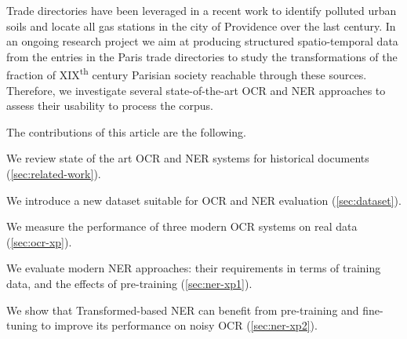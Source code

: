 Trade directories have been leveraged in a recent work to identify polluted urban soils \cite{bell2020automated} and locate all gas stations in the city of Providence over the last century.
In an ongoing research project we aim at producing structured spatio-temporal data from the entries in the Paris trade directories to study the transformations of the fraction of XIX\textsuperscript{th} century Parisian society reachable through these sources.
Therefore, we investigate several state-of-the-art OCR and NER approaches to assess their usability to process the corpus.

The contributions of this article are the following.
\begin{enumerate*}[(i)]
    \item We review state of the art OCR and NER systems for historical documents (\cref{sec:related-work}).
    \item We introduce a new dataset suitable for OCR and NER evaluation (\cref{sec:dataset}).
    \item We measure the performance of three modern OCR systems on real data (\cref{sec:ocr-xp}).
    \item We evaluate modern NER approaches: their requirements in terms of training data, and the effects of pre-training (\cref{sec:ner-xp1}).
    \item We show that Transformed-based NER can benefit from pre-training and fine-tuning to improve its performance on noisy OCR (\cref{sec:ner-xp2}).
\end{enumerate*}


